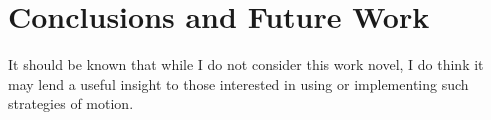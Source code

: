 


\clearpage
\section{Conclusions and Future Work}
It should be known that while I do not consider this work novel, I do think it may lend a useful insight to those interested in using or implementing such strategies of motion.


























